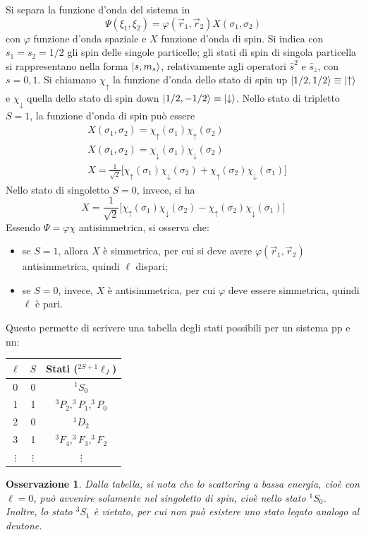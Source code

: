 \documentclass[11pt, a4paper]{scrartcl}
\theoremstyle{style}
\newtheorem{osservazione}{Osservazione}[section]
\numberwithin{equation}{subsection}
\begin{document}
Si separa la funzione d'onda del sistema in 
\[
\Psi(\xi _1,\xi _2) = \varphi (\vec{r}_1, \vec{r}_2) X (\sigma _1,\sigma _2)
\] 
con $\varphi $ funzione d'onda spaziale e $X$ funzione d'onda di spin. 
Si indica con $s_1 = s_2 = 1 / 2$ gli spin delle singole particelle; gli stati di spin di singola particella si rappresentano nella forma $\ket{s , m_s} $, relativamente agli operatori $\hat{s}^2$ e $\hat{s}_z$, con $s=0,1$.
Si chiamano $\chi _\uparrow$ la funzione d'onda dello stato di spin up $\ket{1 / 2 , 1 / 2} \equiv \ket{\uparrow} $ e $\chi _\downarrow$ quella dello stato di spin down $\ket{1/2 , - 1 / 2} \equiv \ket{\downarrow} $.
Nello stato di tripletto $S=1$, la funzione d'onda di spin pu\`o essere
\begin{align}
	&X (\sigma _1, \sigma _2) = \chi _\uparrow (\sigma _1) \chi _\uparrow (\sigma _2) \tag{$m_s = 1$}\\
	&X (\sigma _1, \sigma _2) = \chi _\downarrow (\sigma _1) \chi _\downarrow (\sigma _2) \tag{$m_s = -1$}\\
	&X = \frac{1}{\sqrt{2} } \big[  \chi _\uparrow(\sigma _1) \chi _\downarrow(\sigma _2) + \chi _\uparrow(\sigma _2) \chi _\downarrow (\sigma _1) \big] \tag{$m_s = 0$}
\end{align}
Nello stato di singoletto $S=0$, invece, si ha
\[
X = \frac{1}{\sqrt{2} } \big[  \chi _\uparrow(\sigma _1) \chi _\downarrow(\sigma _2) - \chi _\uparrow(\sigma _2) \chi _\downarrow (\sigma _1) \big] 
\] 
Essendo $\Psi = \varphi  \chi $ antisimmetrica, si osserva che:
\begin{itemize}
	\item se $S=1$, allora $X$ \`e simmetrica, per cui si deve avere $\varphi (\vec{r}_1, \vec{r}_2)$ antisimmetrica, quindi $\ell$ dispari;
	\item se $S=0$, invece, $X$ \`e antisimmetrica, per cui $\varphi $ deve essere simmetrica, quindi $\ell $ \`e pari.
\end{itemize}
Questo permette di scrivere una tabella degli stati possibili per un sistema pp e nn:
\begin{table}[h!]
	\centering
	\begin{tabular}{c c c}
		$\ell $ & $ S$ & Stati ($^{2S+1}\ell _J$)\\
	\hline
		0&0& $^1S_0$\\
		1 & 1 & $^3 P_2, ^3 P_1, ^3P_0$\\
		2 & 0 & $^1 D_2$\\
		3 & 1 & $^3F_4, ^3 F_3, ^3F_2 $\\
		$\vdots$ & $\vdots$ & $\vdots$\\
	\hline
	\end{tabular}
\end{table}
\begin{osservazione}
Dalla tabella, si nota che lo scattering a bassa energia, cio\`e con $\ell =0$, pu\`o avvenire solamente nel singoletto di spin, cio\`e nello stato $^1S_0$.
Inoltre, lo stato $^3S_1$ \`e vietato, per cui non pu\`o esistere uno stato legato analogo al deutone.
\end{osservazione}
\end{document}
